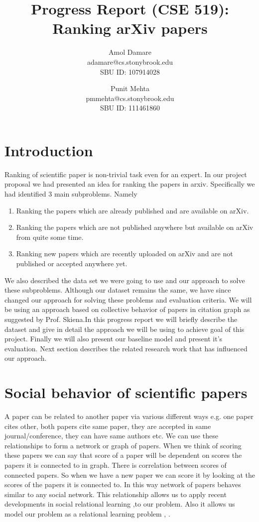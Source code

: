 \documentclass[a4paper, 11pt]{article}
\begin{document}
\title{Progress Report (CSE 519): Ranking arXiv papers}

\author{Amol Damare \\ adamare@cs.stonybrook.edu \\SBU ID: 107914028
\and
Punit Mehta \\  pmmehta@cs.stonybrook.edu \\SBU ID: 111461860}
\maketitle

\section{Introduction}
Ranking of scientific paper is non-trivial task even for an expert. In our project proposal we had presented an idea for ranking the papers in arxiv. Specifically we had identified 3 main subproblems. Namely \\
\begin{enumerate}
\item Ranking the papers which are already published and are available on arXiv.
\item Ranking the papers which are not published anywhere but available on arXiv from quite some time.
\item Ranking new papers which are recently uploaded on arXiv and are not published or accepted anywhere yet.
\end{enumerate}
We also described the data set we were going to use and our approach to solve these subproblems. Although our dataset remains the same, we have since changed our approach for solving these problems and evaluation criteria. We will be using  an approach based on collective behavior of papers in citation graph as suggested by Prof. Skiena.In this progress report we will briefly describe the dataset and give in detail the approach we will be using to achieve goal of this project. Finally we will also present our baseline model and present it's evaluation. Next section describes the related research work  that has influenced our approach.
\section{Social behavior of scientific papers}
A paper can be related to another paper via various different ways e.g. one paper cites other, both papers cite same paper, they are accepted in same journal/conference, they can have same authors etc. We can use these relationships to form a network or graph of papers. When we think of scoring these papers we can say that score of a paper will be dependent on scores the papers it is connected to in graph. There is correlation between scores of connected papers. So when we have a new paper we can score it by looking at the scores of the papers it is connected to. In this way network of papers behaves similar to any social network. This relationship allows us to apply recent developments in social relational learning \cite{deepwalk}  ,\cite{tang2011leveraging}to our problem. Also it allows us model our problem as a relational learning problem \cite{tang2009scalable}, \cite{tang2009relational}. 
\end{document}
